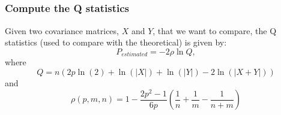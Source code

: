 \documentclass[11pt]{article}
\begin{document}
    \begin{center}
    \end{center}
    { \hspace*{\fill} \\}
    
    \begin{center}
    \end{center}
    { \hspace*{\fill} \\}
    
    \begin{center}
    \end{center}
    { \hspace*{\fill} \\}
    
    \begin{center}
    \end{center}
    { \hspace*{\fill} \\}
    
    \begin{center}
    \end{center}
    { \hspace*{\fill} \\}
    
    \begin{center}
    \end{center}
    { \hspace*{\fill} \\}
    
    \hypertarget{compute-the-q-statistics}{%
\subsubsection{Compute the Q
statistics}\label{compute-the-q-statistics}}

Given two covariance matrices, \(X\) and \(Y\), that we want to compare,
the Q statistics (used to compare with the theoretical) is given by: \[
P_{estimated} = -2 \rho \ln Q,\] where
\[Q = n (2 p \ln(2) + \ln(|X|) + \ln(|Y|) - 2 \ln(|X + Y|))\] and
\[\rho(p, m, n) = 1 - \frac{2 p^2 - 1}{6 p}  \left(\frac{1}{n} + \frac{1}{m} - \frac{1}{n + m}\right)\]
\end{document}
